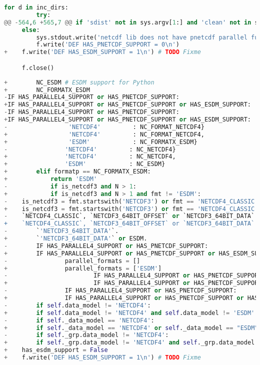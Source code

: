 \begin{lstlisting}[language=python,upquote=true]
     for d in inc_dirs:
         try:
@@ -564,6 +565,7 @@ if 'sdist' not in sys.argv[1:] and 'clean' not in sys.argv[1:]:
     else:
         sys.stdout.write('netcdf lib does not have pnetcdf parallel functions\n')
         f.write('DEF HAS_PNETCDF_SUPPORT = 0\n')
+    f.write('DEF HAS_ESDM_SUPPORT = 1\n') # TODO Fixme

     f.close()
\end{lstlisting}

\begin{lstlisting}[language=python,upquote=true]
+        NC_ESDM # ESDM support for Python
+        NC_FORMATX_ESDM
-IF HAS_PARALLEL4_SUPPORT or HAS_PNETCDF_SUPPORT:
+IF HAS_PARALLEL4_SUPPORT or HAS_PNETCDF_SUPPORT or HAS_ESDM_SUPPORT:
-IF HAS_PARALLEL4_SUPPORT or HAS_PNETCDF_SUPPORT:
+IF HAS_PARALLEL4_SUPPORT or HAS_PNETCDF_SUPPORT or HAS_ESDM_SUPPORT:
-                 'NETCDF4'         : NC_FORMAT_NETCDF4}
+                 'NETCDF4'         : NC_FORMAT_NETCDF4,
+                 'ESDM'            : NC_FORMATX_ESDM}
-                'NETCDF4'         : NC_NETCDF4}
+                'NETCDF4'         : NC_NETCDF4,
+                'ESDM'            : NC_ESDM}
+        elif formatp == NC_FORMATX_ESDM:
+            return 'ESDM'
-            if is_netcdf3 and N > 1:
+            if is_netcdf3 and N > 1 and fmt != 'ESDM':
-    is_netcdf3 = fmt.startswith('NETCDF3') or fmt == 'NETCDF4_CLASSIC'
+    is_netcdf3 = fmt.startswith('NETCDF3') or fmt == 'NETCDF4_CLASSIC' or fmt == 'ESDM'
-    `NETCDF4_CLASSIC`, `NETCDF3_64BIT_OFFSET` or `NETCDF3_64BIT_DATA`."""
+    `NETCDF4_CLASSIC`, `NETCDF3_64BIT_OFFSET` or `NETCDF3_64BIT_DATA` or ESDM."""
-        `'NETCDF3_64BIT_DATA'`.
+        `'NETCDF3_64BIT_DATA'` or ESDM.
-        IF HAS_PARALLEL4_SUPPORT or HAS_PNETCDF_SUPPORT:
+        IF HAS_PARALLEL4_SUPPORT or HAS_PNETCDF_SUPPORT or HAS_ESDM_SUPPORT:
-                parallel_formats = []
+                parallel_formats = ['ESDM']
-                        IF HAS_PARALLEL4_SUPPORT or HAS_PNETCDF_SUPPORT:
+                        IF HAS_PARALLEL4_SUPPORT or HAS_PNETCDF_SUPPORT or HAS_ESDM_SUPPORT:
-                IF HAS_PARALLEL4_SUPPORT or HAS_PNETCDF_SUPPORT:
+                IF HAS_PARALLEL4_SUPPORT or HAS_PNETCDF_SUPPORT or HAS_ESDM_SUPPORT:
-        if self.data_model != 'NETCDF4':
+        if self.data_model != 'NETCDF4' and self.data_model != 'ESDM':
-        if self._data_model == 'NETCDF4':
+        if self._data_model == 'NETCDF4' or self._data_model == "ESDM":
-        if self._grp.data_model != 'NETCDF4':
+        if self._grp.data_model != 'NETCDF4' and self._grp.data_model != 'ESDM':
+    has_esdm_support = False
+    f.write('DEF HAS_ESDM_SUPPORT = 1\n') # TODO Fixme
\end{lstlisting}

